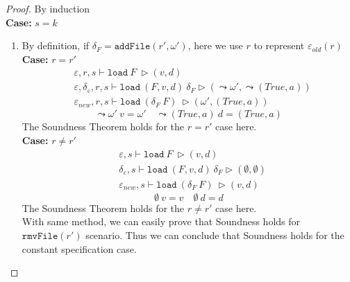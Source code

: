 \documentclass[10pt,twoside,a4paper]{article}
\theoremstyle{theorem}
\theoremstyle{lemma}
\theoremstyle{property}
\theoremstyle{definition}
\theoremstyle{assumption}
\begin{document}
\begin{proof}
	By induction\\
	\textbf{Case: } $s = k$\\
	\begin{enumerate}
	\begin{comment}
	\item
	By definition, if $\varepsilon_{old}(r) \not= \varepsilon_{new}(r)$,
	\begin{align*}
			& \varepsilon, s \vdash \mathtt{load}~ F~ \rhd (v,d)\\
			& \delta_\varepsilon, s \vdash \mathtt{load}~ (F,v,d)~ \delta_F \rhd (\leadsto \omega', \leadsto (True, a))\\
			& \varepsilon_{new}, s \vdash \mathtt{load}~ (\delta_F~F)~ \rhd (\omega', (True, a))
	\end{align*}
	\begin{displaymath}
		\leadsto \omega' ~v = \omega' \quad \leadsto (True, a) ~d = (True, a)
	\end{displaymath}
	The Soundness Theorem holds for the $\varepsilon_{old}(r) \not= \varepsilon_{new}(r)$ case here. \\
	\end{comment}
	\item
	By definition, if $\delta_F = \mathtt{addFile}(r',\omega')$, here we use $r$ to represent $\varepsilon_{old}(r)$ \\
	\textbf{Case: } $r = r'$
	\begin{align*}
			& \varepsilon, r, s \vdash \mathtt{load}~ F~ \rhd (v,d)\\
			& \varepsilon, \delta_\varepsilon, r, s \vdash \mathtt{load}~ (F,v,d)~ \delta_F \rhd (\leadsto \omega', \leadsto (True, a))\\
			& \varepsilon_{new}, r, s \vdash \mathtt{load}~ (\delta_F~F)~ \rhd (\omega', (True, a))
	\end{align*}
	\begin{displaymath}
		\leadsto \omega' ~v = \omega' \quad \leadsto (True, a) ~d = (True, a)
	\end{displaymath}
	The Soundness Theorem holds for the $r = r'$ case here. \\
	\textbf{Case: } $r \not= r'$
	\begin{align*}
			& \varepsilon, s \vdash \mathtt{load}~ F~ \rhd (v,d)\\
			& \delta_\varepsilon, s \vdash \mathtt{load}~ (F,v,d)~ \delta_F \rhd (\emptyset, \emptyset)\\
			& \varepsilon_{new}, s \vdash \mathtt{load}~ (\delta_F~F)~ \rhd (v,d)
	\end{align*}
	\begin{displaymath}
		\emptyset ~v = v \quad \emptyset ~d = d
	\end{displaymath}
	The Soundness Theorem holds for the $r \not= r'$ case here.\\
	With same method, we can easily prove that Soundness holds for $\mathtt{rmvFile}(r')$ scenario. 
	Thus we can conclude that Soundness holds for the constant specification case.
	\end{enumerate}
	

\end{proof}
\end{document}
